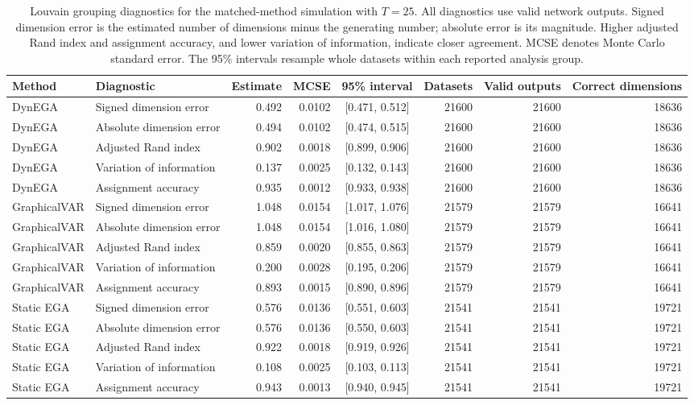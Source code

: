 \documentclass[
]{article}
\begin{document}
\begin{landscape}
\begin{table}
\caption{\label{tab:grouping-t25}Louvain grouping diagnostics for the matched-method simulation with $T=25$. All diagnostics use valid network outputs. Signed dimension error is the estimated number of dimensions minus the generating number; absolute error is its magnitude. Higher adjusted Rand index and assignment accuracy, and lower variation of information, indicate closer agreement. MCSE denotes Monte Carlo standard error. The 95\% intervals resample whole datasets within each reported analysis group.}
\centering
\begin{tabular}[t]{llrrcrrr}
\toprule
Method & Diagnostic & Estimate & MCSE & 95\% interval & Datasets & Valid outputs & Correct dimensions\\
\midrule
DynEGA & Signed dimension error & 0.492 & 0.0102 & {}[0.471, 0.512] & 21600 & 21600 & 18636\\
DynEGA & Absolute dimension error & 0.494 & 0.0102 & {}[0.474, 0.515] & 21600 & 21600 & 18636\\
DynEGA & Adjusted Rand index & 0.902 & 0.0018 & {}[0.899, 0.906] & 21600 & 21600 & 18636\\
DynEGA & Variation of information & 0.137 & 0.0025 & {}[0.132, 0.143] & 21600 & 21600 & 18636\\
DynEGA & Assignment accuracy & 0.935 & 0.0012 & {}[0.933, 0.938] & 21600 & 21600 & 18636\\
\addlinespace
GraphicalVAR & Signed dimension error & 1.048 & 0.0154 & {}[1.017, 1.076] & 21579 & 21579 & 16641\\
GraphicalVAR & Absolute dimension error & 1.048 & 0.0154 & {}[1.016, 1.080] & 21579 & 21579 & 16641\\
GraphicalVAR & Adjusted Rand index & 0.859 & 0.0020 & {}[0.855, 0.863] & 21579 & 21579 & 16641\\
GraphicalVAR & Variation of information & 0.200 & 0.0028 & {}[0.195, 0.206] & 21579 & 21579 & 16641\\
GraphicalVAR & Assignment accuracy & 0.893 & 0.0015 & {}[0.890, 0.896] & 21579 & 21579 & 16641\\
\addlinespace
Static EGA & Signed dimension error & 0.576 & 0.0136 & {}[0.551, 0.603] & 21541 & 21541 & 19721\\
Static EGA & Absolute dimension error & 0.576 & 0.0136 & {}[0.550, 0.603] & 21541 & 21541 & 19721\\
Static EGA & Adjusted Rand index & 0.922 & 0.0018 & {}[0.919, 0.926] & 21541 & 21541 & 19721\\
Static EGA & Variation of information & 0.108 & 0.0025 & {}[0.103, 0.113] & 21541 & 21541 & 19721\\
Static EGA & Assignment accuracy & 0.943 & 0.0013 & {}[0.940, 0.945] & 21541 & 21541 & 19721\\
\bottomrule
\end{tabular}
\end{table}
\clearpage
\normalsize\end{landscape}
\end{document}
